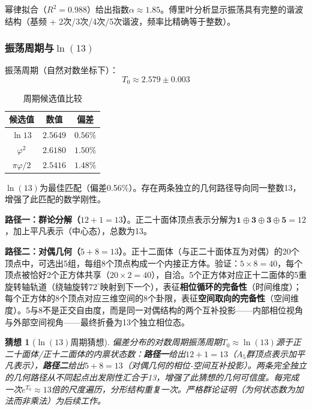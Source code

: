 \documentclass[12pt,a4paper,twocolumn]{article}
\renewcommand{\phi}{\varphi}
\newtheorem{conjecture}[theorem]{猜想}
\begin{document}
幂律拟合（$R^2 = 0.988$）给出指数$\alpha \approx 1.85$。傅里叶分析显示振荡具有完整的谐波结构（基频 + 2次/3次/4次/5次谐波，频率比精确等于整数）。

\subsubsection{振荡周期与$\ln(13)$}

振荡周期（自然对数坐标下）：
\begin{equation}
T_0 \approx 2.579 \pm 0.003
\end{equation}

\begin{table}[htbp]
\centering
\caption{周期候选值比较}
\label{tab:period_candidates}
\begin{tabular}{ccc}
\hline
候选值 & 数值 & 偏差 \\
\hline
$\ln 13$ & $2.5649$ & $0.56\%$ \\
$\phi^2$ & $2.6180$ & $1.50\%$ \\
$\pi\phi/2$ & $2.5416$ & $1.48\%$ \\
\hline
\end{tabular}
\end{table}

$\ln(13)$为最佳匹配（偏差0.56\%）。存在两条独立的几何路径导向同一整数13，增强了此匹配的数学刚性。

\textbf{路径一：群论分解（$12 + 1 = 13$）}。正二十面体顶点表示分解为$\mathbf{1}\oplus\mathbf{3}\oplus\mathbf{3}\oplus\mathbf{5} = 12$，加上平凡表示（中心态），总数为13。

\textbf{路径二：对偶几何（$5 + 8 = 13$）}。正十二面体（与正二十面体互为对偶）的20个顶点中，可选出5组，每组8个顶点构成一个内接正方体。验证：$5 \times 8 = 40$，每个顶点被恰好2个正方体共享（$20 \times 2 = 40$），自洽。5个正方体对应正十二面体的5重旋转轴轨道（绕轴旋转$72^\circ$映射到下一个），表征\textbf{相位循环的完备性}（时间维度）；每个正方体的8个顶点对应三维空间的8个卦限，表征\textbf{空间取向的完备性}（空间维度）。5与8不是正交自由度，而是同一对偶结构的两个互补投影——内部相位视角与外部空间视角——最终折叠为13个独立相位态。

\begin{conjecture}[$\ln(13)$周期猜想]
\label{conj:ln13}
偏差分布的对数周期振荡周期$T_0 \approx \ln(13)$源于正二十面体/正十二面体的内禀状态数：\textbf{路径一}给出$12+1=13$（$A_5$群顶点表示加平凡表示），\textbf{路径二}给出$5+8=13$（对偶几何的相位-空间互补投影）。两条完全独立的几何路径从不同起点出发刚性汇合于13，增强了此猜想的几何可信度。每完成一次$e^{T_0}\approx 13$倍的尺度遍历，分形结构重复一次。严格群论证明（为何状态数为加法而非乘法）为后续工作。
\end{conjecture}
\end{document}
